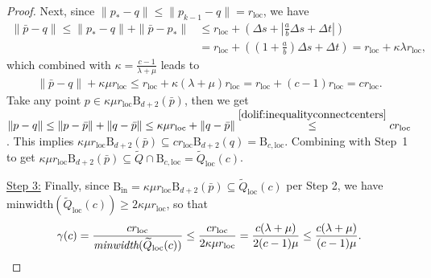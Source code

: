 \documentclass[10pt,a4paper]{amsart}
\newcommand{\Q}{\widetilde{Q}}
\newcommand{\ball}{\mathrm{B}}
\newcommand{\local}{\mathrm{loc}}
\newcommand{\norm}[1]{\left\lVert #1 \right\rVert}
\begin{document}
\begin{proof}
\smallskip

Next, since $\| p_*- q\|\le \| p_{k-1}- q\|=r_\local$, we have
\begin{align*}
\|\bar p- q\|
\le \| p_*- q\|+\|\bar p- p_*\|
&\le r_\local+\left(\Delta s+\left|\frac{a}{b}\Delta s+\Delta t\right|\right)\\
&= r_\local+\left(\left(1+\frac{a}{b}\right)\Delta s+\Delta t\right)
= r_\local+\kappa \lambda r_\local,
\end{align*}
which combined with $\kappa=\frac{c-1}{\lambda+\mu}$ leads to
\begin{align}
\label{dolif:inequalityconnectcenters}
\|\bar p- q\|+\kappa\mu r_\local
\le r_\local+\kappa(\lambda+\mu)r_\local
= r_\local+(c-1)r_\local
= c r_\local. 
\end{align}
Take any point $p\in \kappa\mu r_\local \ball_{d+2}(\bar p)$, then we get $\norm{p- q}\leq \norm{p-\bar p}+\norm{ q-\bar p}\leq  \kappa\mu r_\local+\|q-\bar p\|\stackrel{\eqref{dolif:inequalityconnectcenters}}{\leq} c r_\local$.
This implies $\kappa\mu r_\local \ball_{d+2}(\bar p)\subseteq c r_\local \ball_{d+2}( q)=\ball_{c,\local}$. Combining with Step~1 to get
$\kappa\mu r_\local \ball_{d+2}(\bar p)\subseteq \Q\cap \ball_{c,\local}=\Q_\local(c)$. 

\smallskip
\underline{Step 3:} Finally, since $\ball_{\mathrm{in}}=\kappa\mu r_\local \ball_{d+2}(\bar p)\subseteq \Q_\local(c)$ per Step 2, we have $\mbox{minwidth}(\Q_\local(c))\ge 2\kappa\mu r_\local$,
so that
\[
\gamma(c)=\frac{c r_\local}{\mbox{\em minwidth}(\Q_\local(c))}
\le \frac{c r_\local}{2\kappa\mu r_\local}
= \frac{c(\lambda+\mu)}{2(c-1)\mu}
\le \frac{c(\lambda+\mu)}{(c-1)\mu}.
\]
\end{proof}
\end{document}
